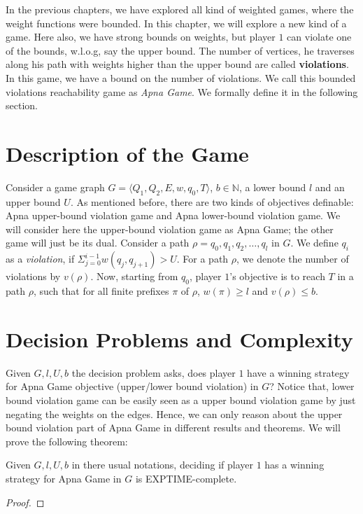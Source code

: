  In the previous chapters, we have explored all kind of weighted games, where the weight functions were bounded. In this chapter, we will explore a new kind of a game. Here also, we have strong bounds on weights, but player $1$ can violate one of the bounds, w.l.o.g, say the upper bound. The number of vertices, he traverses along his path with weights higher than the upper bound are called \textbf{violations}. In this game, we have a bound on the number of violations. We call this bounded violations reachability game as \textit{Apna Game}. We formally define it in the following section.\\

\section{Description of the Game}
Consider a game graph $G=\langle Q_1, Q_2, E, w, q_0, T \rangle$, $b \in \mathbb{N}$, a lower bound $l$ and an upper bound $U$. As mentioned before, there are two kinds of objectives definable: Apna upper-bound violation game and Apna lower-bound violation game. We will consider here the upper-bound violation game as Apna Game; the other game will just be its dual. Consider a path $\rho= q_0,q_1,q_2,\ldots,q_l$ in $G$. We define $q_i$ as a \textit{violation}, if $\Sigma_{j=0}^{i-1} w(q_j,q_{j+1}) > U$. For a path $\rho$, we denote the number of violations by $v(\rho)$. Now, starting from $q_0$, player $1$'s objective is to reach $T$ in a path $\rho$, such that for all finite prefixes $\pi$ of $\rho$, $w(\pi) \geq l$ and $v(\rho) \leq b$. 

\section{Decision Problems and Complexity}

Given $G,l,U,b$ the decision problem asks, does player $1$ have a winning strategy for Apna Game objective (upper/lower bound violation) in $G$? Notice that, lower bound violation game can be easily seen as a upper bound violation game by just negating the weights on the edges. Hence, we can only reason about the upper bound violation part of Apna Game in different results and theorems. We will prove the following theorem:
\begin{theorem}
Given $G,l,U,b$ in there usual notations, deciding if player $1$ has a winning strategy for Apna Game in $G$ is EXPTIME-complete.
\end{theorem}

\begin{proof}
	
\end{proof}



